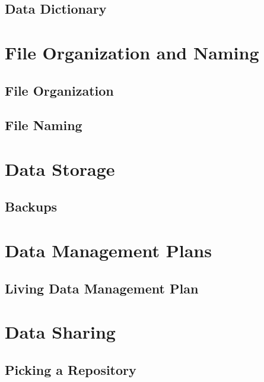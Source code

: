 \documentclass[
]{book}
\begin{document}
\hypertarget{data-dictionary}{%
\section{Data Dictionary}\label{data-dictionary}}

\hypertarget{file-organization-and-naming}{%
\chapter{File Organization and Naming}\label{file-organization-and-naming}}

\hypertarget{file-organization}{%
\section{File Organization}\label{file-organization}}

\hypertarget{file-naming}{%
\section{File Naming}\label{file-naming}}

\hypertarget{data-storage}{%
\chapter{Data Storage}\label{data-storage}}

\hypertarget{backups}{%
\section{Backups}\label{backups}}

\hypertarget{data-management-plans}{%
\chapter{Data Management Plans}\label{data-management-plans}}

\hypertarget{living-data-management-plan}{%
\section{Living Data Management Plan}\label{living-data-management-plan}}

\hypertarget{data-sharing}{%
\chapter{Data Sharing}\label{data-sharing}}

\hypertarget{picking-a-repository}{%
\section{Picking a Repository}\label{picking-a-repository}}
\end{document}
